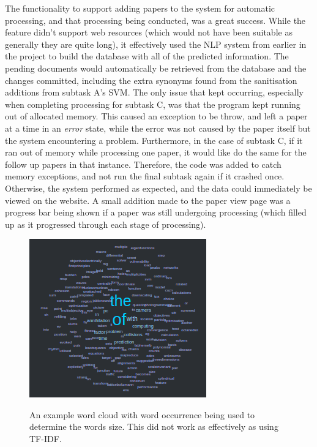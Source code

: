 

The functionality to support adding papers to the system for automatic processing, and that processing being conducted, was a great success. While the feature didn't support web resources (which would not have been suitable as generally they are quite long), it effectively used the NLP system from earlier in the project to build the database with all of the predicted information. The pending documents would automatically be retrieved from the database and the changes committed, including the extra synonyms found from the sanitisation additions from subtask A's SVM. The only issue that kept occurring, especially when completing processing for subtask C, was that the program kept running out of allocated memory. This caused an exception to be throw, and left a paper at a time in an \textit{error} state, while the error was not caused by the paper itself but the system encountering a problem. Furthermore, in the case of subtask C, if it ran out of memory while processing one paper, it would like do the same for the follow up papers in that instance. Therefore, the code was added to catch memory exceptions, and not run the final subtask again if it crashed once. Otherwise, the system performed as expected, and the data could immediately be viewed on the website. A small addition made to the paper view page was a progress bar being shown if a paper was still undergoing processing (which filled up as it progressed through each stage of processing).

\begin{figure}
	\centering
	\includegraphics{img/cloud-bad.png} \\
	\caption[The Word Clouds with Word Occurance As The Size Metric]{An example word cloud with word occurrence being used to determine the words size. This did not work as effectively as using TF-IDF.}
	\label{figure:extractoriecloud-bad}
\end{figure}


